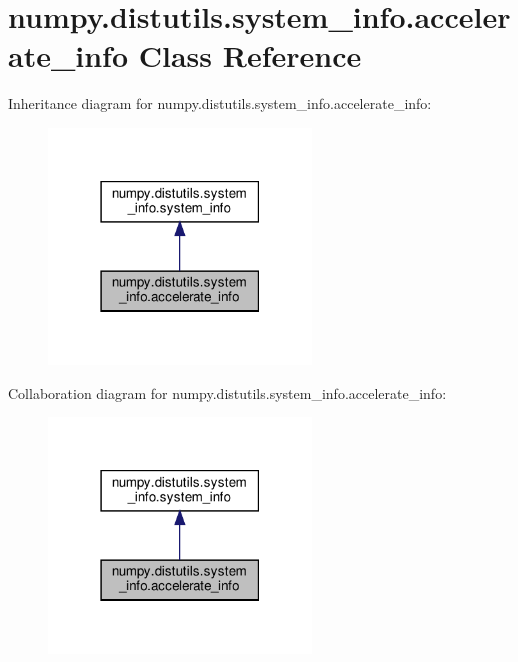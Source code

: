 \hypertarget{classnumpy_1_1distutils_1_1system__info_1_1accelerate__info}{}\section{numpy.\+distutils.\+system\+\_\+info.\+accelerate\+\_\+info Class Reference}
\label{classnumpy_1_1distutils_1_1system__info_1_1accelerate__info}


Inheritance diagram for numpy.\+distutils.\+system\+\_\+info.\+accelerate\+\_\+info\+:
\nopagebreak
\begin{figure}[H]
\begin{center}
\leavevmode
\includegraphics[width=198pt]{classnumpy_1_1distutils_1_1system__info_1_1accelerate__info__inherit__graph}
\end{center}
\end{figure}


Collaboration diagram for numpy.\+distutils.\+system\+\_\+info.\+accelerate\+\_\+info\+:
\nopagebreak
\begin{figure}[H]
\begin{center}
\leavevmode
\includegraphics[width=198pt]{classnumpy_1_1distutils_1_1system__info_1_1accelerate__info__coll__graph}
\end{center}
\end{figure}
